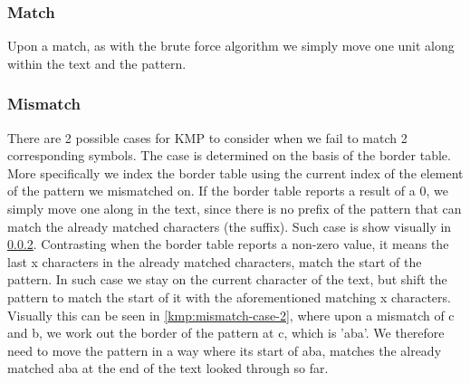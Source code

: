 \documentclass{l4proj}
\begin{document}
\subsubsection{Match}
Upon a match, as with the brute force algorithm we simply move one unit along within the text and the pattern.

\subsubsection{Mismatch} There are 2 possible cases for KMP to consider when we fail to match 2 corresponding symbols. The case is determined on the basis of the border table. More specifically we index the border table using the current index of the element of the pattern we mismatched on.  If the border table reports a result of a 0, we simply move one along in the text, since there is no prefix of the pattern that can match the already matched characters (the suffix). Such case is show visually in \ref{}.
Contrasting when the border table reports a non-zero value, it means the last x characters in the already matched characters, match the start of the pattern. In such case we stay on the current character of the text, but shift the pattern to match the start of it with the aforementioned matching x characters. Visually this can be seen in \ref{kmp:mismatch-case-2}, where upon a mismatch of c and b, we work out the border of the pattern at c, which is 'aba'. We therefore need to move the pattern in a way where its start of aba, matches the already matched aba at the end of the text looked through so far.
\end{document}
